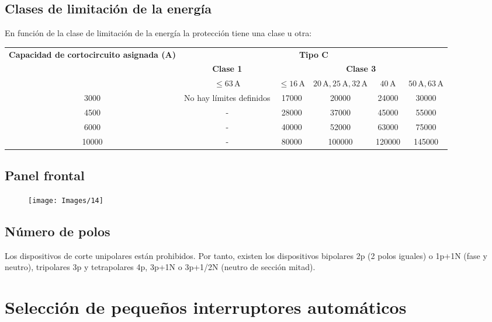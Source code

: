 \subsection{Clases de limitación de la energía}
En función de la clase de limitación de la energía la protección tiene una clase u otra:
\begin{table}[H]
	\centering
	\begin{adjustbox}{width=1\textwidth}

	\begin{tabular}{|c|c|c|c|c|c|}
		\hline
		\multirow{2}{*}{\textbf{Capacidad de cortocircuito asignada (A)}} & \multicolumn{5}{c|}{\textbf{Tipo C}} \\ \cline{2-6} 
		& \textbf{Clase 1} & \multicolumn{4}{c|}{\textbf{Clase 3}} \\ \cline{2-6} 
		& $\leq 63 \, \text{A}$ & $\leq 16 \, \text{A}$ & $20 \, \text{A}, 25 \, \text{A}, 32 \, \text{A}$ & $40 \, \text{A}$ & $50 \, \text{A}, 63 \, \text{A}$ \\ \hline
		3000  & No hay límites definidos &17000 & 20000 & 24000 & 30000 \\ \hline
		4500  & - &28000 & 37000 & 45000 & 55000 \\ \hline
		6000  & - & 40000 & 52000 & 63000 & 75000 \\ \hline
		10000 & - &80000 & 100000 & 120000 & 145000 \\ \hline
	\end{tabular}
		
	\end{adjustbox}
\end{table}
\subsection{Panel frontal}
\begin{figure}[H]
	\centering
	\texttt{[image: Images/14]}
	\label{fig:14}
\end{figure}
\subsection{Número de polos}
Los dispositivos de corte unipolares están prohibidos. Por tanto, existen los dispositivos bipolares 2p (2 polos iguales) o 1p+1N (fase y neutro), tripolares 3p y tetrapolares 4p, 3p+1N o 3p+1/2N (neutro de sección mitad).
\section{Selección de pequeños interruptores automáticos}
